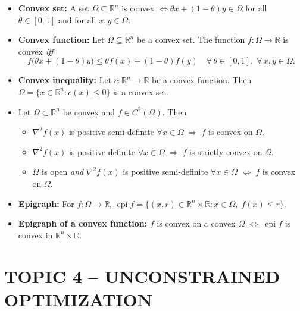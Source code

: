 \documentclass[12pt]{article}
\begin{document}
\begin{itemize}
  \item \textbf{Convex set:} A set $\Omega\subseteq \mathbb{R}^n$ is convex $\Leftrightarrow \theta x + (1-\theta) y\in\Omega$ for all $\theta\in[0,1]$ and for all $x,y\in\Omega$.
  \item \textbf{Convex function:} Let $\Omega\subseteq \mathbb{R}^n$ be a convex set. The function $f:\Omega\to\mathbb{R}$ is convex \emph{iff}
  \[
    f\bigl(\theta x + (1-\theta) y\bigr) \le \theta f(x) + (1-\theta) f(y)\quad \forall\,\theta\in[0,1],\;\forall\,x,y\in\Omega.
  \]
  \item \textbf{Convex inequality:} Let $c: \mathbb{R}^n \to \mathbb{R}$ be a convex function. Then $\Omega=\{x\in\mathbb{R}^n: c(x)\le 0\}$ is a convex set.
  \item Let $\Omega\subset \mathbb{R}^n$ be convex and $f\in C^2(\Omega)$. Then
  \begin{itemize}
    \item $\nabla^2 f(x)$ is positive semi-definite $\forall x\in\Omega \;\Rightarrow\; f$ is convex on $\Omega$.
    \item $\nabla^2 f(x)$ is positive definite $\forall x\in\Omega \;\Rightarrow\; f$ is strictly convex on $\Omega$.
    \item $\Omega$ is open \emph{and} $\nabla^2 f(x)$ is positive semi-definite $\forall x\in\Omega$ $\Leftrightarrow\; f$ is convex on $\Omega$.
  \end{itemize}
  \item \textbf{Epigraph:} For $f: \Omega\to\mathbb{R}$, $\operatorname{epi} f = \{(x,r)\in\mathbb{R}^n\times\mathbb{R}: x\in\Omega,\; f(x)\le r\}$.
  \item \textbf{Epigraph of a convex function:} $f$ is convex on a convex $\Omega$ $\Leftrightarrow\; \operatorname{epi} f$ is convex in $\mathbb{R}^n\times\mathbb{R}$.
\end{itemize}

\bigskip
\section*{TOPIC 4 -- UNCONSTRAINED OPTIMIZATION}
\end{document}
